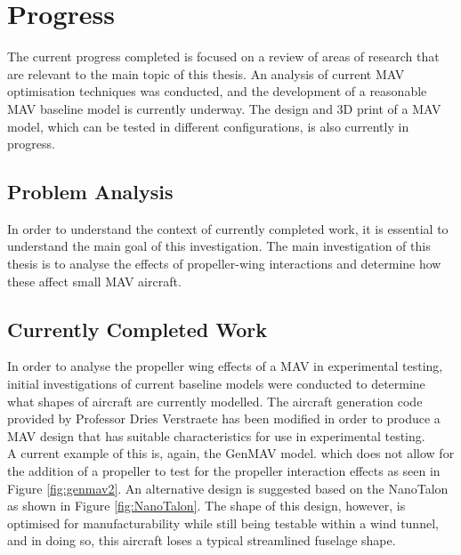 \graphicspath{{./Figs/}}

\chapter{Progress} 
The current progress completed is focused on a review of areas of research that are relevant to the main topic of this thesis. An analysis of current MAV optimisation techniques was conducted, and the development of a reasonable MAV baseline model is currently underway. The design and 3D print of a MAV model, which can be tested in different configurations, is also currently in progress. 

\section{Problem Analysis}
\label{sec: ProblemAnalysis}
In order to understand the context of currently completed work, it is essential to understand the main goal of this investigation. The main investigation of this thesis is to analyse the effects of propeller-wing interactions and determine how these affect small MAV aircraft. 

\section{Currently Completed Work}
\label{sec: completedWork}

In order to analyse the propeller wing effects of a MAV in experimental testing, initial investigations of current baseline models were conducted to determine what shapes of aircraft are currently modelled. The aircraft generation code provided by Professor Dries Verstraete has been modified in order to produce a MAV design that has suitable characteristics for use in experimental testing.\\

A current example of this is, again, the GenMAV model.
\cite{Stewart2007} which does not allow for the addition of a propeller to test for the propeller interaction effects as seen in Figure \ref{fig:genmav2}. An alternative design is suggested based on the NanoTalon as shown in Figure \ref{fig:NanoTalon}. The shape of this design, however, is optimised for manufacturability while still being testable within a wind tunnel, and in doing so, this aircraft loses a typical streamlined fuselage shape. \\ 


